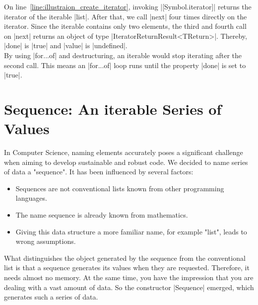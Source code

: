 On line~\ref{line:illustraion_create_iterator}, invoking |[Symbol.iterator]|
returns the iterator of the iterable |list|. 
After that, we call |next| four times directly on the iterator. Since the
iterable contains only two elements, the third and fourth call on |next|
returns an object of type |IteratorReturnResult<TReturn>|. Thereby, |done| is
|true| and |value| is |undefined|. \\
By using |for...of| and destructuring, an iterable would stop iterating after
the second call. This means an |for...of| loop runs until the property |done|
is set to |true|.

\section{Sequence: An iterable Series of Values}
\label{sec:Sequence: A Series of Values}
In Computer Science, naming elements accurately poses a significant challenge 
when aiming to develop sustainable and robust code. We decided to name series
of data a "sequence". It has been influenced by several factors:

\begin{itemize}
  \item Sequences are not conventional lists known from other programming
    languages.
\item The name sequence is already known from mathematics.
\item Giving this data structure a more familiar name, for example "list",
  leads to wrong assumptions. 
\end{itemize}
What distinguishes the object generated by the sequence from the conventional
list is that a sequence generates its values when they are requested.
Therefore, it needs almost no memory. At the same time, you have the impression
that you are dealing with a vast amount of data. So the constructor |Sequence|
emerged, which generates such a series of data.

